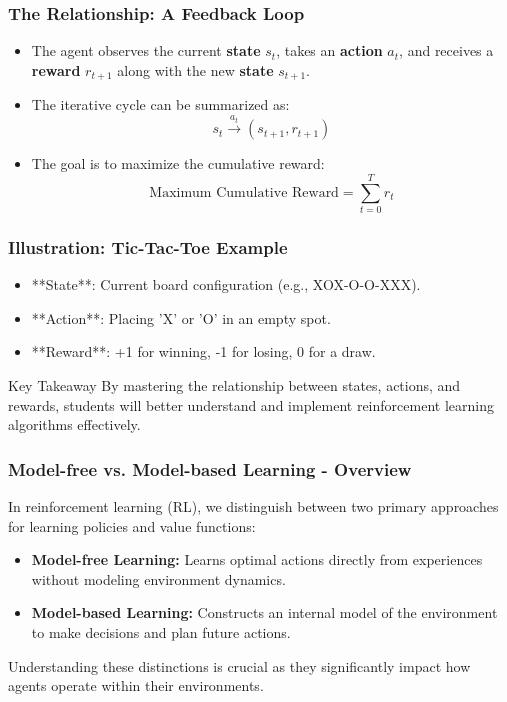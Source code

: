 \documentclass[aspectratio=169]{beamer}
\begin{document}
\begin{frame}[fragile]
    \frametitle{The Relationship: A Feedback Loop}
    \begin{itemize}
        \item The agent observes the current \textbf{state} \( s_t \), takes an \textbf{action} \( a_t \), and receives a \textbf{reward} \( r_{t+1} \) along with the new \textbf{state} \( s_{t+1} \).
        
        \item The iterative cycle can be summarized as:
        \[
        s_t \xrightarrow{a_t} (s_{t+1}, r_{t+1})
        \]

        \item The goal is to maximize the cumulative reward:
        \[
        \text{Maximum Cumulative Reward} = \sum_{t=0}^{T} r_t
        \]
    \end{itemize}
\end{frame}

\begin{frame}[fragile]
    \frametitle{Illustration: Tic-Tac-Toe Example}
    \begin{itemize}
        \item **State**: Current board configuration (e.g., XOX-O-O-XXX).
        \item **Action**: Placing 'X' or 'O' in an empty spot.
        \item **Reward**: +1 for winning, -1 for losing, 0 for a draw.
    \end{itemize}

    \begin{block}{Key Takeaway}
        By mastering the relationship between states, actions, and rewards, students will better understand and implement reinforcement learning algorithms effectively.
    \end{block}
\end{frame}

\begin{frame}[fragile]
    \frametitle{Model-free vs. Model-based Learning - Overview}
    In reinforcement learning (RL), we distinguish between two primary approaches for learning policies and value functions:

    \begin{itemize}
        \item \textbf{Model-free Learning:} Learns optimal actions directly from experiences without modeling environment dynamics.
        \item \textbf{Model-based Learning:} Constructs an internal model of the environment to make decisions and plan future actions.
    \end{itemize}

    Understanding these distinctions is crucial as they significantly impact how agents operate within their environments.
\end{frame}
\end{document}
